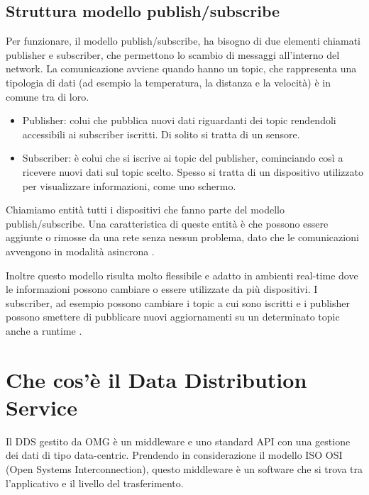 \subsection{Struttura modello publish/subscribe}
Per funzionare, il modello publish/subscribe, ha bisogno di
due elementi chiamati publisher e subscriber, 
che permettono lo scambio di messaggi all'interno del network.
La comunicazione avviene 
quando hanno un topic, che
rappresenta una tipologia di dati (ad esempio la temperatura, 
la distanza e la velocità) è in comune tra di loro.
\begin{itemize}
    \item Publisher: colui che pubblica nuovi dati riguardanti dei
    topic rendendoli accessibili ai subscriber iscritti. 
    Di solito si tratta di un sensore.
    \item Subscriber: è colui che si iscrive ai topic del publisher, 
    cominciando
    così a ricevere nuovi dati sul topic scelto. Spesso si tratta
    di un dispositivo utilizzato per visualizzare informazioni, come uno
    schermo.
\end{itemize}
Chiamiamo entità tutti i dispositivi che fanno parte del modello 
publish/subscribe.
Una caratteristica di queste entità è che possono essere aggiunte o rimosse
da una rete senza nessun problema, dato che le 
comunicazioni avvengono in modalità asincrona \cite{dds1.4}. 

Inoltre questo modello risulta molto
flessibile e adatto in ambienti real-time dove le informazioni
possono cambiare o essere utilizzate da più dispositivi.
I subscriber, ad esempio possono cambiare i topic a cui 
sono iscritti e i publisher possono smettere di pubblicare nuovi
aggiornamenti su un determinato topic anche a runtime \cite{OH2010318}.

\section{Che cos'è il Data Distribution Service}

Il DDS gestito da OMG è un middleware e uno standard API con una gestione
dei dati di tipo data-centric. 
Prendendo in considerazione il modello ISO OSI 
(Open Systems Interconnection), questo
middleware è un software che si trova tra l'applicativo e il livello
del trasferimento.


